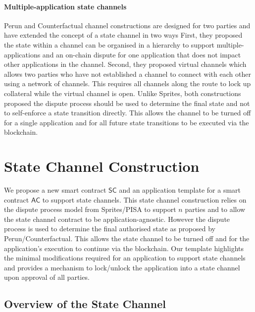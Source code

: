 \documentclass{llncs}
\newcommand{\statechannel}{\mathsf{SC}}
\newcommand{\appcontract}{\mathsf{AC}}
\begin{document}
\paragraph{Multiple-application state channels}
Perun and Counterfactual channel constructions are designed for two parties and have extended the concept of a state channel in two ways \cite{dziembowski2017perun,coleman2018counterfactual} 
First, they proposed the state within a channel can be organised in a hierarchy to support multiple-applications and an on-chain dispute for one application that does not impact other applications in the channel. 
Second, they proposed virtual channels which allows two parties who have not established a channel to connect with each other using a network of channels. 
This requires all channels along the route to lock up collateral while the virtual channel is open. 
Unlike Sprites, both constructions proposed the dispute process should be used to determine the final state and not to self-enforce a state transition directly. 
This allows the channel to be turned off for a single application and for all future state transitions to be executed via the blockchain. 

\section{State Channel Construction} 

We propose a new smart contract $\statechannel$ and an application template for a smart contract $\appcontract$ to support state channels. 
This state channel construction relies on the dispute process model from Sprites/PISA to support $n$ parties and to allow the state channel contract to be application-agnostic. 
However the dispute process is used to determine the final authorised state as proposed by Perun/Counterfactual. 
This allows the state channel to be turned off and for the application's execution to continue via the blockchain.
Our template highlights the minimal modifications required for an application to support state channels and provides a mechanism to lock/unlock the application into a state channel upon approval of all parties. 

\subsection{Overview of the State Channel}
\end{document}
